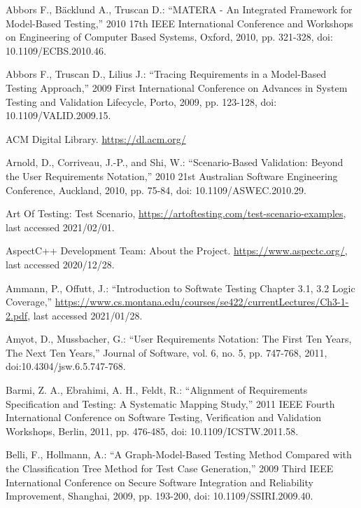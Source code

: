 \documentclass[a4paper,10pt, bibliography=totocnumbered]{scrreprt}
\begin{document}
\begin{thebibliography}{9}

 Abbors F., Bäcklund A., Truscan D.: \enquote{MATERA - An Integrated Framework for Model-Based Testing,} 2010 17th IEEE International Conference and Workshops on Engineering of Computer Based Systems, Oxford, 2010, pp. 321-328, doi: 10.1109/ECBS.2010.46.

 Abbors F., Truscan D., Lilius J.: \enquote{Tracing Requirements in a Model-Based Testing Approach,} 2009 First International Conference on Advances in System Testing and Validation Lifecycle, Porto, 2009, pp. 123-128, doi: 10.1109/VALID.2009.15.

 ACM Digital Library. \url{https://dl.acm.org/} 

 Arnold, D., Corriveau, J.-P., and Shi, W.: \enquote{Scenario-Based Validation: Beyond the User Requirements Notation,} 2010 21st Australian Software Engineering Conference, Auckland, 2010, pp. 75-84, doi: 10.1109/ASWEC.2010.29.

 Art Of Testing: Test Scenario, \url{https://artoftesting.com/test-scenario-examples}, last accessed 2021/02/01.

 AspectC++ Development Team: About the Project.
\url{https://www.aspectc.org/}, last accessed 2020/12/28.

 Ammann, P., Offutt, J.: \enquote{Introduction to Softwate Testing Chapter 3.1, 3.2 Logic Coverage,} \url{https://www.cs.montana.edu/courses/se422/currentLectures/Ch3-1-2.pdf}, last accessed 2021/01/28.

 Amyot, D., Mussbacher, G.: \enquote{User Requirements Notation: The First Ten Years, The Next Ten Years,} Journal of Software, vol. 6, no. 5, pp. 747-768, 2011, doi:10.4304/jsw.6.5.747-768.

 Barmi, Z. A., Ebrahimi, A. H., Feldt, R.: \enquote{Alignment of Requirements Specification and Testing: A Systematic Mapping Study,} 2011 IEEE Fourth International Conference on Software Testing, Verification and Validation Workshops, Berlin, 2011, pp. 476-485, doi: 10.1109/ICSTW.2011.58.

Belli, F., Hollmann, A.: \enquote{A Graph-Model-Based Testing Method Compared with the Classification Tree Method for Test Case Generation,} 2009 Third IEEE International Conference on Secure Software Integration and Reliability Improvement, Shanghai, 2009, pp. 193-200, doi: 10.1109/SSIRI.2009.40.


\end{thebibliography}
\end{document}
